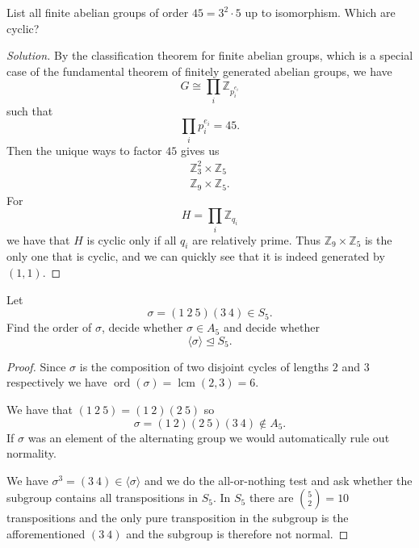 \begin{prob}
    List all finite abelian groups of 
    order $45 = 3^2 \cdot 5$ up to 
    isomorphism. Which are cyclic?
\end{prob}
\begin{proof}[Solution]
    By the classification theorem for finite 
    abelian groups, which is a special case of the 
    fundamental theorem of finitely generated abelian 
    groups, we have 
    \[
        G \cong \prod_{i}\mathbb Z_{p_i^{e_i}}
    \]
    such that 
    \[
        \prod_{i} p_i^{e_i} = 45.
    \]
    Then the unique ways to factor $45$ gives 
    us 
    \begin{align*}
        \mathbb Z_{3}^2 \times \mathbb Z_5 \\ 
        \mathbb Z_9 \times \mathbb Z_5. 
    \end{align*}
    For 
    \[
        H = \prod_i \mathbb Z_{q_i}
    \]
    we have that $H$ is cyclic only if 
    all $q_i$ are relatively prime. 
    Thus $\mathbb Z_9 \times \mathbb Z_5$ is 
    the only one that is cyclic, and 
    we can quickly see that it is 
    indeed generated by $(1,1)$. 
\end{proof}
\begin{prob}
    Let 
    \[
        \sigma = (1 \ 2 \ 5)(3 \ 4) \in S_5.
    \]
    Find the order of $\sigma$, decide whether 
    $\sigma \in A_5$ and decide whether 
    \[
        \langle \sigma \rangle \trianglelefteq 
        S_5.
    \]
\end{prob}
\begin{proof}
    Since $\sigma$ is the composition of 
    two disjoint cycles of lengths $2$ and 
    $3$ respectively we have 
    $\operatorname{ord}(\sigma) = 
    \operatorname{lcm}(2,3) = 6$.

    We have that $(1 \ 2 \ 5) = (1 \ 2)(2 \ 5)$ so 
    \[
        \sigma = (1 \ 2)(2 \ 5)(3 \ 4) \not\in A_5.
    \]
    If $\sigma$ was an element of the alternating group 
    we would automatically rule out normality. 

    We have $\sigma^3 = (3 \ 4) \in \langle \sigma \rangle$ 
    and we do the all-or-nothing test and ask whether 
    the subgroup contains all transpositions in $S_5$. 
    In $S_5$ there are $\binom{5}{2} = 10$ transpositions 
    and the only pure transposition in the subgroup is 
    the afforementioned $(3 \ 4)$ and the subgroup is 
    therefore not normal.
\end{proof}

